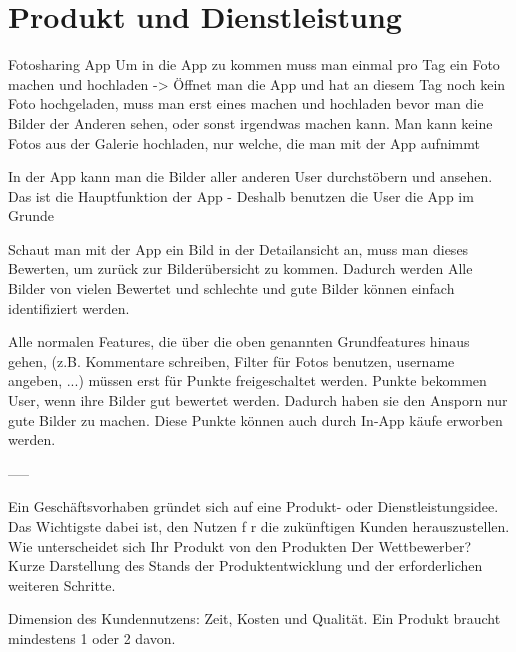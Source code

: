 \chapter{Produkt und Dienstleistung}

Fotosharing App
Um in die App zu kommen muss man einmal pro Tag ein Foto machen und hochladen
-> Öffnet man die App und hat an diesem Tag noch kein Foto hochgeladen, muss man erst eines machen und hochladen bevor man die Bilder der Anderen sehen, oder sonst irgendwas machen kann.
Man kann keine Fotos aus der Galerie hochladen, nur welche, die man mit der App aufnimmt

In der App kann man die Bilder aller anderen User durchstöbern und ansehen. Das ist die Hauptfunktion der App - Deshalb benutzen die User die App im Grunde

Schaut man mit der App ein Bild in der Detailansicht an, muss man dieses Bewerten, um zurück zur Bilderübersicht zu kommen. Dadurch werden Alle Bilder von vielen Bewertet und schlechte und gute Bilder können einfach identifiziert werden.

Alle normalen Features, die über die oben genannten Grundfeatures hinaus gehen, (z.B. Kommentare schreiben, Filter für Fotos benutzen, username angeben, ...) müssen erst für Punkte freigeschaltet werden.
Punkte bekommen User, wenn ihre Bilder gut bewertet werden. Dadurch haben sie den Ansporn nur gute Bilder zu machen.
Diese Punkte können auch durch In-App käufe erworben werden.


-----

Ein Geschäftsvorhaben gründet sich auf eine Produkt- oder Dienstleistungsidee.
Das Wichtigste dabei ist, den Nutzen f r die zukünftigen Kunden herauszustellen.
Wie unterscheidet sich Ihr Produkt von den Produkten
Der Wettbewerber?
Kurze Darstellung des Stands der Produktentwicklung und der erforderlichen weiteren Schritte.

Dimension des Kundennutzens: Zeit, Kosten und Qualität. Ein Produkt braucht mindestens 1 oder 2 davon.

